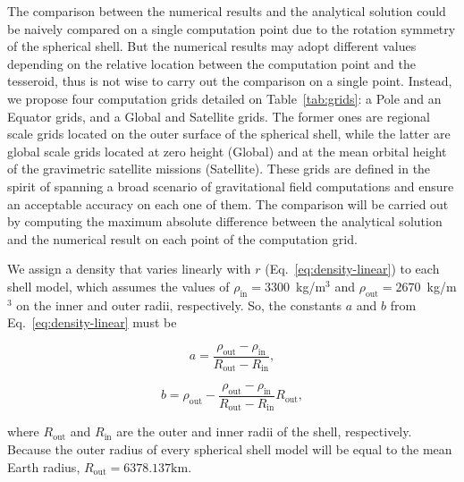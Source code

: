 \documentclass[extra, referee]{gji}
\begin{document}
The comparison between the numerical results and the analytical solution could be
naively compared on a single computation point due to the rotation symmetry of the
spherical shell.
But the numerical results may adopt different values depending on the relative location
between the computation point and the tesseroid, thus is not wise to carry out the
comparison on a single point.
Instead, we propose four computation grids detailed on Table~\ref{tab:grids}: a Pole and
an Equator grids, and a Global and Satellite grids.
The former ones are regional scale grids located on the outer surface of the spherical
shell, while the latter are global scale grids located at zero height (Global) and at
the mean orbital height of the gravimetric satellite missions (Satellite).
These grids are defined in the spirit of spanning a broad scenario of gravitational
field computations and ensure an acceptable accuracy on each one of them.
The comparison will be carried out by computing the maximum absolute difference between
the analytical solution and the numerical result on each point of the computation grid.

We assign a density that varies linearly with $r$ (Eq.~\ref{eq:density-linear}) to each
shell model, which assumes the values of $\rho_\text{in} = 3300$~kg/m$^3$ and
$\rho_\text{out} = 2670$~kg/m$^3$ on the inner and outer radii, respectively.
So, the constants $a$ and $b$ from Eq.~\ref{eq:density-linear} must be

\begin{equation}
    a = \frac{\rho_\text{out} - \rho_\text{in}}{R_\text{out} - R_\text{in}},
\end{equation}

\begin{equation}
    b = \rho_\text{out} -
    \frac{\rho_\text{out} - \rho_\text{in}}{R_\text{out} - R_\text{in}} R_\text{out},
\end{equation}

\noindent
where $R_\text{out}$ and $R_\text{in}$ are the outer and inner radii of the shell,
respectively.
Because the outer radius of every spherical shell model will be equal to the mean Earth
radius, $R_\text{out} = 6378.137 \text{km}$.
\end{document}
